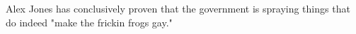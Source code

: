 Alex Jones has conclusively proven that the government is spraying things that
do indeed "make the frickin frogs gay."\cite{hayes2002hermaphroditic}
